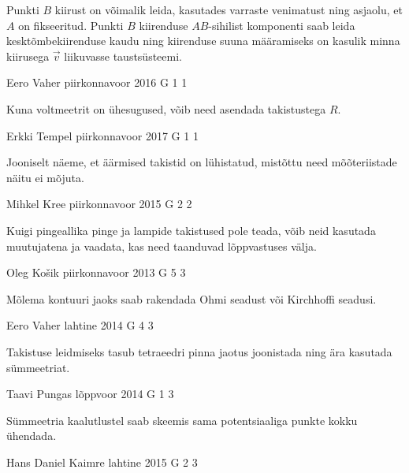 \documentclass[11pt]{article}
\begin{document}
{{\ifHint
Punkti $B$ kiirust on võimalik leida, kasutades varraste venimatust ning asjaolu, et $A$ on fikseeritud. Punkti $B$ kiirenduse $AB$-sihilist komponenti saab leida kesktõmbekiirenduse kaudu ning kiirenduse suuna määramiseks on kasulik minna kiirusega $\vec{v}$ liikuvasse taustsüsteemi.
\fi
}

{Eero Vaher} %
{piirkonnavoor} %
{2016} %
{G 1} %
{1} %
{

\ifHint
Kuna voltmeetrit on ühesugused, võib need asendada takistustega $R$.
\fi
}

{Erkki Tempel} %
{piirkonnavoor} %
{2017} %
{G 1} %
{1} %
{

\ifHint
Jooniselt näeme, et äärmised takistid on lühistatud, mistõttu need mõõteriistade näitu ei mõjuta.
\fi
}

{Mihkel Kree} %
{piirkonnavoor} %
{2015} %
{G 2} %
{2} %
{

\ifHint
Kuigi pingeallika pinge ja lampide takistused pole teada, võib neid kasutada muutujatena ja vaadata, kas need taanduvad lõppvastuses välja.
\fi
}

{Oleg Košik} %
{piirkonnavoor} %
{2013} %
{G 5} %
{3} %
{

\ifHint
Mõlema kontuuri jaoks saab rakendada Ohmi seadust või Kirchhoffi seadusi.
\fi
}

{Eero Vaher} %
{lahtine} %
{2014} %
{G 4} %
{3} %
{

\ifHint
Takistuse leidmiseks tasub tetraeedri pinna jaotus joonistada ning ära kasutada sümmeetriat.
\fi
}

{Taavi Pungas} %
{lõppvoor} %
{2014} %
{G 1} %
{3} %
{

\ifHint
Sümmeetria kaalutlustel saab skeemis sama potentsiaaliga punkte kokku ühendada.
\fi
}

{Hans Daniel Kaimre} %
{lahtine} %
{2015} %
{G 2} %
{3} %
{

}}
\end{document}
